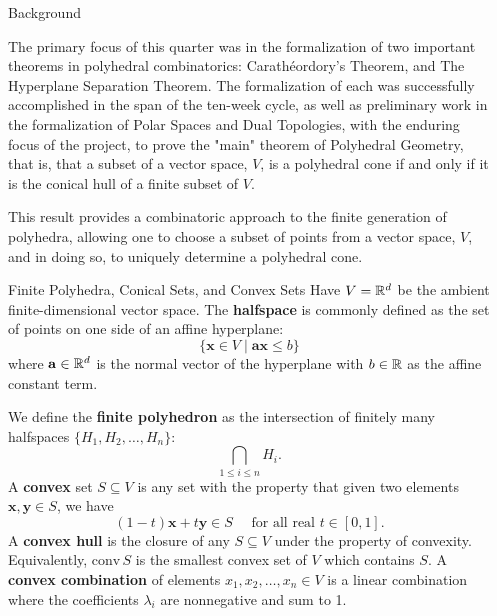 \documentclass[final]{beamer}
\newlength{\sepwidth}
\newlength{\colwidth}
\newcommand{\separatorcolumn}{\begin{column}{\sepwidth}\end{column}}
\begin{document}
\begin{frame}[fragile]
    \begin{columns}[t]
        \separatorcolumn

        \begin{column}{\colwidth}

            \begin{block}{Background}
           
                The primary focus of this quarter was in the formalization of two important theorems in polyhedral combinatorics:
                Carath\'eordory's Theorem, and The Hyperplane Separation Theorem. The formalization of each was successfully accomplished in the
                span of the ten-week cycle, as well as preliminary work in the formalization of Polar Spaces and Dual Topologies, with the enduring
                focus of the project, to prove the "main" theorem of Polyhedral Geometry, that is, that a subset of a vector space, $V$, is a polyhedral cone
                if and only if it is the conical hull of a finite subset of $V$.

                This result provides a combinatoric approach to the finite generation of polyhedra, allowing one to choose a subset of points from a vector space,
                $V$, and in doing so, to uniquely determine a polyhedral cone.
            \end{block}

            \begin{block}{Finite Polyhedra, Conical Sets, and Convex Sets}
                Have $V = \mathbb{R}^d$ be the ambient finite-dimensional vector space. The \textbf{halfspace} is commonly defined as the set of points on one side of an affine hyperplane:
                $$ \{\mathbf{x} \in V \;|\; \mathbf{ax} \leq b\}$$
                where $\mathbf{a} \in \mathbb{R}^d$ is the normal vector of the hyperplane with $b \in \mathbb{R}$ as the affine constant term.

                We define the \textbf{finite polyhedron} as the intersection of finitely many halfspaces $\{H_1,H_2,\dots,H_n\}$:
                $$ \bigcap_{1 \leq i \leq n} H_i. $$
                A \textbf{convex} set $S \subseteq V$ is any set with the property that given two elements $\mathbf{x}, \mathbf{y} \in S$, we have
                $$ (1 - t)\mathbf{x} + t\mathbf{y} \in S \quad \text{ for all real } t \in [0,1].$$
                A \textbf{convex hull} is the closure of any $S \subseteq V$ under the property of convexity. Equivalently, $\text{conv}\,S$ is the smallest convex set of $V$ which contains $S$. A \textbf{convex combination} of elements $x_1,x_2,\dots,x_n \in V$ is a linear combination where the coefficients $\lambda_i$ are nonnegative and sum to 1. 


\end{block}
\end{column}
\end{columns}
\end{frame}
\end{document}
